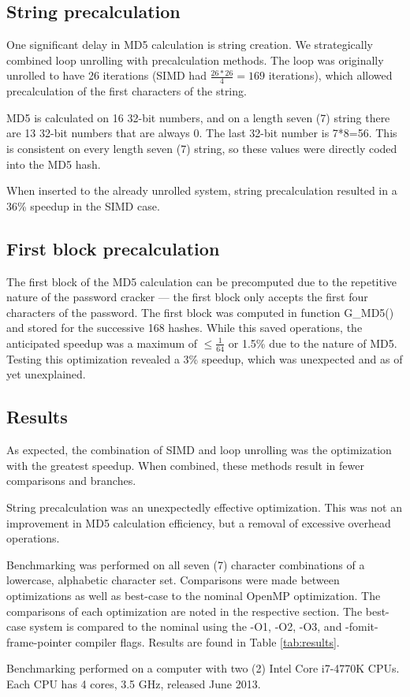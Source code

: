 	\subsection{String precalculation}
		One significant delay in MD5 calculation is string creation. We strategically combined loop unrolling with precalculation methods. The loop was originally unrolled to have 26 iterations (SIMD had $\frac{26*26}{4}=169$ iterations), which allowed precalculation of the first characters of the string. 

		MD5 is calculated on 16 32-bit numbers, and on a length seven (7) string there are 13 32-bit numbers that are always 0. The last 32-bit number is 7*8=56. This is consistent on every length seven (7) string, so these values were directly coded into the MD5 hash.

		When inserted to the already unrolled system, string precalculation resulted in a 36\% speedup in the SIMD case. 

	\subsection{First block precalculation}
		The first block of the MD5 calculation can be precomputed due to the repetitive nature of the password cracker --- the first block only accepts the first four characters of the password. The first block was computed in function G\_MD5() and stored for the successive 168 hashes. While this saved operations, the anticipated speedup was a maximum of $\le\frac{1}{64}$ or 1.5\% due to the nature of MD5. Testing this optimization revealed a 3\% speedup, which was unexpected and as of yet unexplained.  

	\subsection{Results}
		As expected, the combination of SIMD and loop unrolling was the optimization with the greatest speedup. When combined, these methods result in fewer comparisons and branches. 

		String precalculation was an unexpectedly effective optimization. This was not an improvement in MD5 calculation efficiency, but a removal of excessive overhead operations.  

		Benchmarking was performed on all seven (7) character combinations of a lowercase, alphabetic character set. Comparisons were made between optimizations as well as best-case to the nominal OpenMP optimization. The comparisons of each optimization are noted in the respective section. The best-case system is compared to the nominal using the -O1, -O2, -O3, and -fomit-frame-pointer compiler flags. Results are found in Table \ref{tab:results}.
\begin{table}[t]
  \centering
  \small
  \caption{Benchmarking performed on a computer with two (2) Intel Core i7-4770K CPUs. Each CPU has 4 cores, 3.5 GHz, released June 2013.}%
  
  \label{tab:results}%
\end{table}%

